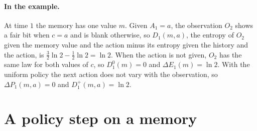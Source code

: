 \documentclass{article}
\theoremstyle{definition}
\newcommand{\dE}{\Delta E}
\newcommand{\dP}{\Delta P}
\begin{document}
\paragraph{In the example.} At time $1$ the memory has one value $m$. Given $A_1=a$, the observation $O_2$ shows a fair bit when $c=a$ and is blank otherwise, so $D_1(m,a)$, the entropy of $O_2$ given the memory value and the action minus its entropy given the history and the action, is $\tfrac32\ln2-\tfrac12\ln2=\ln2$. When the action is not given, $O_2$ has the same law for both values of $c$, so $D^0_1(m)=0$ and $\dE_1(m)=\ln2$. With the uniform policy the next action does not vary with the observation, so $\dP_1(m,a)=0$ and $D^+_1(m,a)=\ln2$.

\section{A policy step on a memory}\label{sec:step}
\end{document}
